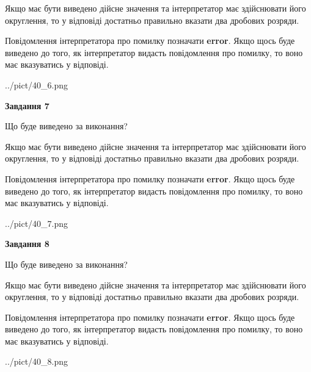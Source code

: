 \documentclass[12pt, ukrainian]{article}
\begin{document}
{\begin {Large}
Якщо має бути виведено дійсне значення та інтерпретатор має здійснювати його округлення, 
то у відповіді достатньо правильно вказати два дробових розряди.

Повідомлення інтерпретатора про помилку позначати \textbf{error}.
Якщо щось буде виведено до того, як інтерпретатор видасть повідомлення про помилку, 
то воно має вказуватись у відповіді. \par

\begin{center}
	{../pict/40_6.png}
\end{center}
\newpage

{\begin {center}\textbf{Завдання 7}\end {center}}\par
Що буде виведено за виконання? \par

Якщо має бути виведено дійсне значення та інтерпретатор має здійснювати його округлення, 
то у відповіді достатньо правильно вказати два дробових розряди.

Повідомлення інтерпретатора про помилку позначати \textbf{error}.
Якщо щось буде виведено до того, як інтерпретатор видасть повідомлення про помилку, 
то воно має вказуватись у відповіді. \par

\begin{center}
	{../pict/40_7.png}
\end{center}
\newpage

{\begin {center}\textbf{Завдання 8}\end {center}}\par
Що буде виведено за виконання? \par

Якщо має бути виведено дійсне значення та інтерпретатор має здійснювати його округлення, 
то у відповіді достатньо правильно вказати два дробових розряди.

Повідомлення інтерпретатора про помилку позначати \textbf{error}.
Якщо щось буде виведено до того, як інтерпретатор видасть повідомлення про помилку, 
то воно має вказуватись у відповіді. \par

\begin{center}
	{../pict/40_8.png}
\end{center}
\newpage


\end{Large}}
\end{document}
